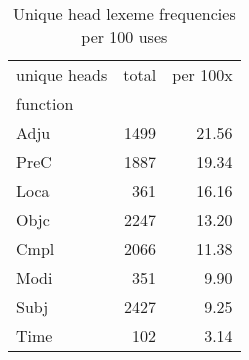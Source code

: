 \begin{table}[htbp!]
\centering
\caption{Unique head lexeme frequencies per 100 uses}
\label{table:uniqueper100}
\begin{tabular}{lrr}
\toprule
unique heads &  total &  per 100x \\
function &        &           \\
\midrule
Adju     &   1499 &     21.56 \\
PreC     &   1887 &     19.34 \\
Loca     &    361 &     16.16 \\
Objc     &   2247 &     13.20 \\
Cmpl     &   2066 &     11.38 \\
Modi     &    351 &      9.90 \\
Subj     &   2427 &      9.25 \\
Time     &    102 &      3.14 \\
\bottomrule
\end{tabular}
\end{table}
